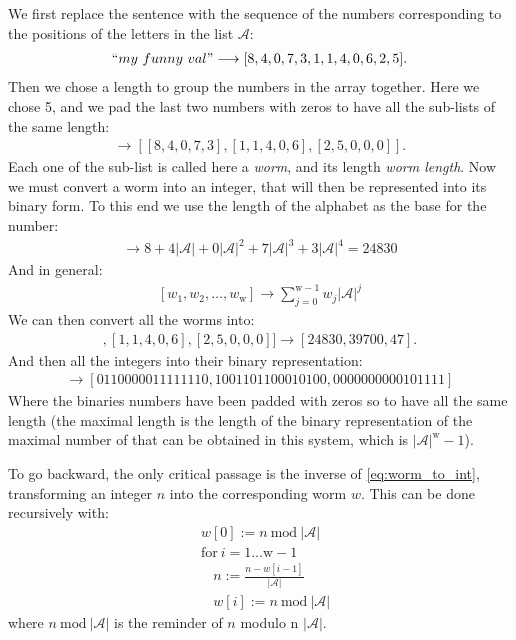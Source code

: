 \noindent
We first replace the sentence with the sequence of the numbers corresponding to the positions of the letters in the list $\mathcal{A}$:
\begin{align*}
   ``my~funny~val" \longrightarrow [8, 4, 0, 7, 3, 1, 1, 4, 0, 6, 2, 5].
\end{align*}
Then we chose a length to group the numbers in the array together. Here we chose 5, and we pad the last two numbers with zeros to have all the sub-lists of the same length:
\begin{align*}
   [8, 4, 0, 7, 3, 1, 1, 4, 0, 6, 2, 5] \longrightarrow [[8, 4, 0, 7, 3], [1, 1, 4, 0, 6], [2, 5, 0, 0, 0]].
\end{align*}
Each one of the sub-list is called here a \emph{worm}, and its length \emph{worm length}. Now we must convert a worm into an integer, that will then be represented into its binary form. To this end we use the length of the alphabet as the base for the number:
\begin{align*}
   [8, 4, 0, 7, 3]
   \longrightarrow
   8 + 4 \vert \mathcal{A}\vert + 0 \vert \mathcal{A}\vert^2 + 7\vert \mathcal{A}\vert^3 + 3\vert \mathcal{A}\vert^4 = 24830
\end{align*}
And in general:
\begin{align}\label{eq:worm_to_int}
   [w_1, w_2, \dots, w_{\text{w}}]
   \longrightarrow
   \sum_{j=0}^{\text{w} - 1} w_j \vert \mathcal{A}\vert^j
\end{align}
We can then convert all the worms into:
\begin{align*}
   [[8, 4, 0, 7, 3], [1, 1, 4, 0, 6], [2, 5, 0, 0, 0]]
   \longrightarrow
   [24830, 39700, 47].
\end{align*}
And then all the integers into their binary representation:
\begin{align*}
   [24830, 39700, 47] \longrightarrow [0110000011111110, 1001101100010100, 0000000000101111]
\end{align*}
Where the binaries numbers have been padded with zeros so to have all the same length (the maximal length is the length of the binary representation of the maximal number of that can be obtained in this system, which is $\vert \mathcal{A}\vert^{\text{w}} - 1$).

To go backward, the only critical passage is the inverse of \ref{eq:worm_to_int}, transforming an integer $n$ into the corresponding worm $w$. This can be done recursively with:
\begin{align*}
   &w[0] := n ~\text{mod}~ \vert\mathcal{A}\vert \\
   &\text{for}~i=1\dots \text{w}-1\\
   &~~~~ n := \frac{n - w[i-1]}{\vert\mathcal{A}\vert} \\
   &~~~~ w[i] := n ~\text{mod}~ \vert\mathcal{A}\vert
\end{align*}
where $n ~\text{mod}~ \vert\mathcal{A}\vert$ is the reminder of $n$ modulo n $\vert\mathcal{A}\vert$.

